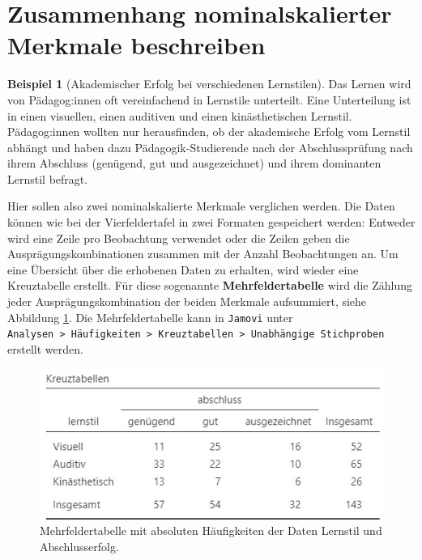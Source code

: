 \documentclass[
]{book}
\theoremstyle{definition}
\theoremstyle{definition}
\newtheorem{example}{Beispiel}[chapter]
\theoremstyle{definition}
\theoremstyle{definition}
\theoremstyle{remark}
\begin{document}
\section{Zusammenhang nominalskalierter Merkmale beschreiben}\label{zusammenhang-nominalskalierter-merkmale-beschreiben}

\begin{example}[Akademischer Erfolg bei verschiedenen Lernstilen]
\protect\hypertarget{exm:learning-style}{}\label{exm:learning-style}Das Lernen wird von Pädagog:innen oft vereinfachend in Lernstile unterteilt. Eine Unterteilung ist in einen visuellen, einen auditiven und einen kinästhetischen Lernstil. Pädagog:innen wollten nur herausfinden, ob der akademische Erfolg vom Lernstil abhängt und haben dazu Pädagogik-Studierende nach der Abschlussprüfung nach ihrem Abschluss (genügend, gut und ausgezeichnet) und ihrem dominanten Lernstil befragt.
\end{example}

Hier sollen also zwei nominalskalierte Merkmale verglichen werden. Die Daten können wie bei der Vierfeldertafel in zwei Formaten gespeichert werden: Entweder wird eine Zeile pro Beobachtung verwendet oder die Zeilen geben die Ausprägungskombinationen zusammen mit der Anzahl Beobachtungen an. Um eine Übersicht über die erhobenen Daten zu erhalten, wird wieder eine Kreuztabelle erstellt. Für diese sogenannte \textbf{Mehrfeldertabelle} wird die Zählung jeder Ausprägungskombination der beiden Merkmale aufsummiert, siehe Abbildung \ref{fig:exm-learning-style-data-view}. Die Mehrfeldertabelle kann in \texttt{Jamovi} unter \texttt{Analysen\ \textgreater{}\ Häufigkeiten\ \textgreater{}\ Kreuztabellen\ \textgreater{}\ Unabhängige\ Stichproben} erstellt werden.

\begin{figure}

{\centering \includegraphics{figures/10-exm-learning-style-data-view} 

}

\caption{Mehrfeldertabelle mit absoluten Häufigkeiten der Daten Lernstil und Abschlusserfolg.}\label{fig:exm-learning-style-data-view}
\end{figure}
\end{document}
